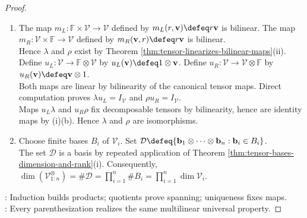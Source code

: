\begin{theorem}
\begin{proof}
\begin{enumerate}[label=(\roman*)]
\item The map $m_L:\mathbb{F}\times\mathcal{V}\to\mathcal{V}$ defined by $m_L(r,\mathbf{v})\defeq r\mathbf{v}$ is bilinear. The map $m_R:\mathcal{V}\times\mathbb{F}\to\mathcal{V}$ defined by $m_R(\mathbf{v},r)\defeq r\mathbf{v}$ is bilinear.\\
Hence $\lambda$ and $\rho$ exist by Theorem \ref{thm:tensor-linearizes-bilinear-maps}(ii). Define $u_L:\mathcal{V}\to\mathbb{F}\otimes\mathcal{V}$ by $u_L(\mathbf{v})\defeq1\otimes\mathbf{v}$. Define $u_R:\mathcal{V}\to\mathcal{V}\otimes\mathbb{F}$ by $u_R(\mathbf{v})\defeq\mathbf{v}\otimes1$.\\
Both maps are linear by bilinearity of the canonical tensor maps. Direct computation proves $\lambda u_L=I_{\mathcal{V}}$ and $\rho u_R=I_{\mathcal{V}}$.\\
Maps $u_L\lambda$ and $u_R\rho$ fix decomposable tensors by bilinearity, hence are identity maps by (i)(b). Hence $\lambda$ and $\rho$ are isomorphisms.
\item Choose finite bases $B_i$ of $\mathcal{V}_i$. Set $\mathcal{D}\defeq\{\mathbf{b}_1\otimes\cdots\otimes\mathbf{b}_n:\mathbf{b}_i\in B_i\}$.\\
The set $\mathcal{D}$ is a basis by repeated application of Theorem \ref{thm:tensor-bases-dimension-and-rank}(i). Consequently, $\dim(\mathcal{V}_{1:n}^{\otimes})=\#\mathcal{D}=\prod\limits_{i=1}^{n}\#B_i=\prod\limits_{i=1}^{n}\dim\mathcal{V}_i$.
\end{enumerate}
: Induction builds products; quotients prove spanning; uniqueness fixes maps.\\
: Every parenthesization realizes the same multilinear universal property.
\end{proof}
\end{theorem}

